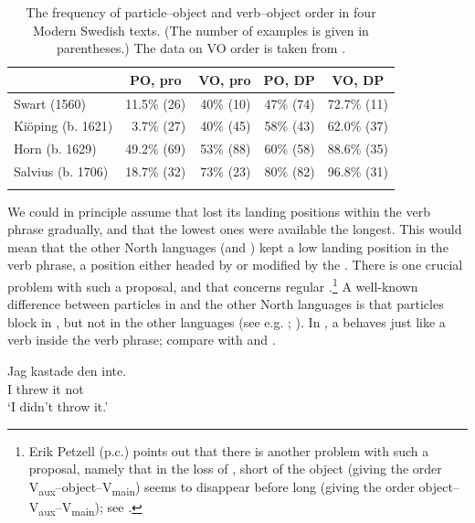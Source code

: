 \documentclass[output=paper]{langscibook}
\begin{document}
\begin{table}
\caption{The frequency of particle–object and verb–object order in four Modern Swedish texts. (The number of examples is given in parentheses.) The data on VO order is taken from \citet{Petzell2012}.\label{tab:lalu:3}}
\begin{tabular}{lrrrr}
\lsptoprule
& \multicolumn{1}{c}{PO, pro} & \multicolumn{1}{c}{VO, pro} & \multicolumn{1}{c}{PO, DP} & \multicolumn{1}{c}{VO, DP}\\\midrule
Swart (1560) & 11.5\% (26) & 40\% (10) & 47\% (74) & 72.7\% (11)\\
Kiöping (b. 1621) & 3.7\% (27) & 40\% (45) & 58\% (43) & 62.0\%   (37)\\
Horn (b. 1629) & 49.2\%   (69) & 53\%   (88) & 60\% (58) & 88.6\% (35)\\
Salvius (b. 1706) & 18.7\% (32) & 73\% (23) & 80\% (82) & 96.8\% (31)\\
\lspbottomrule
\end{tabular}
\end{table}

We could in principle assume that  lost its landing positions within the verb phrase gradually, and that the lowest ones were available the longest. This would mean that the other North  languages (and ) kept a low landing position in the verb phrase, a position either headed by or modified by the . There is one crucial problem with such a proposal, and that concerns regular .\footnote{Erik Petzell (p.c.) points out that there is another problem with such a proposal, namely that in the loss of , short  of the object (giving the order V\textsubscript{aux}–object--V\textsubscript{main}) seems to disappear before long  (giving the order object--V\textsubscript{aux}–V\textsubscript{main}); see \citet{Petzell2012}.} A well-known difference between particles in  and the other North  languages is that particles block  in , but not in the other languages (see e.g. \citealt{Holmberg1986}; \citealt{Sells1998}). In , a  behaves just like a verb inside the verb phrase; compare  with  and .


\ea\label{ex:lalu:47}
\ea\label{ex:lalu:47a}
\gll  Jag   kastade   den   inte.\\
 I       threw   it     not\\
\glt `I didn’t throw it.'
\end{document}
